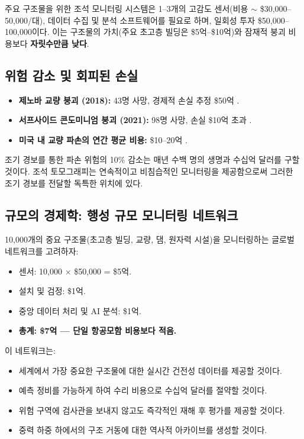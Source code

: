 \documentclass[12pt,a4paper]{article}
\theoremstyle{remark}
\begin{document}
	주요 구조물을 위한 조석 모니터링 시스템은 1–3개의 고감도 센서(비용 \(\sim\) \$30,000–50,000/대), 데이터 수집 및 분석 소프트웨어를 필요로 하며, 일회성 투자 \$50,000–100,000이다. 이는 구조물의 가치(주요 초고층 빌딩은 \$5억–\$10억)와 잠재적 붕괴 비용보다 \textbf{자릿수만큼 낮다}.
	
	\subsection{위험 감소 및 회피된 손실}
	
	\begin{itemize}
		\item \textbf{제노바 교량 붕괴 (2018):} 43명 사망, 경제적 손실 추정 \$50억 \cite{Genoa2018}.
		\item \textbf{서프사이드 콘도미니엄 붕괴 (2021):} 98명 사망, 손실 \$10억 초과 \cite{Surfside2021}.
		\item \textbf{미국 내 교량 파손의 연간 평균 비용:} \$10–20억 \cite{ASCE2021}.
	\end{itemize}
	
	조기 경보를 통한 파손 위험의 10\% 감소는 매년 수백 명의 생명과 수십억 달러를 구할 것이다. 조석 토모그래피는 연속적이고 비침습적인 모니터링을 제공함으로써 그러한 조기 경보를 전달할 독특한 위치에 있다.
	
	\subsection{규모의 경제학: 행성 규모 모니터링 네트워크}
	
	10,000개의 중요 구조물(초고층 빌딩, 교량, 댐, 원자력 시설)을 모니터링하는 글로벌 네트워크를 고려하자:
	
	\begin{itemize}
		\item 센서: 10,000 × \$50,000 = \$5억.
		\item 설치 및 검정: \$1억.
		\item 중앙 데이터 처리 및 AI 분석: \$1억.
		\item \textbf{총계: \$7억 — 단일 항공모함 비용보다 적음.}
	\end{itemize}
	
	이 네트워크는:
	\begin{itemize}
		\item 세계에서 가장 중요한 구조물에 대한 실시간 건전성 데이터를 제공할 것이다.
		\item 예측 정비를 가능하게 하여 수리 비용으로 수십억 달러를 절약할 것이다.
		\item 위험 구역에 검사관을 보내지 않고도 즉각적인 재해 후 평가를 제공할 것이다.
		\item 중력 하중 하에서의 구조 거동에 대한 역사적 아카이브를 생성할 것이다.
	\end{itemize}
	
\end{document}
